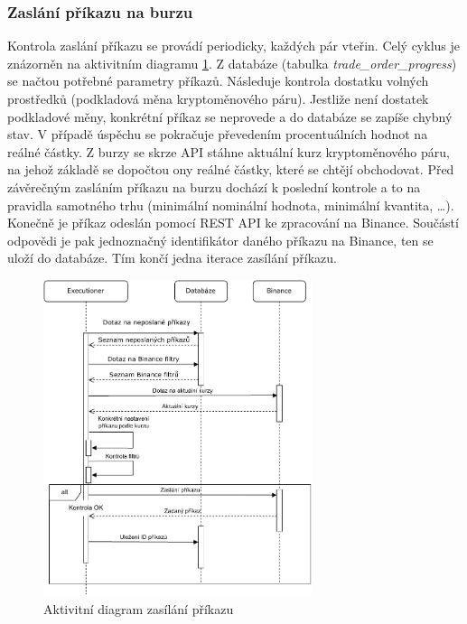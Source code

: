 \subsubsection{Zaslání příkazu na burzu}
Kontrola zaslání příkazu se provádí periodicky, každých pár vteřin. Celý cyklus je znázorněn na aktivitním diagramu \ref{figure:sending-trade-order}.
Z databáze (tabulka \emph{trade\_order\_progress}) se načtou potřebné parametry příkazů. Následuje kontrola
dostatku volných prostředků (podkladová měna kryptoměnového páru). Jestliže není dostatek podkladové měny, konkrétní příkaz se neprovede a do databáze se zapíše chybný stav. V případě
úspěchu se pokračuje převedením procentuálních hodnot na reálné částky. Z burzy se skrze API stáhne aktuální kurz kryptoměnového páru, na jehož základě se dopočtou ony reálné částky, které
se chtějí obchodovat. Před závěrečným zasláním příkazu na burzu dochází k poslední kontrole a to na pravidla samotného trhu (minimální nominální hodnota, minimální kvantita, \ldots).
Konečně je příkaz odeslán pomocí REST API ke zpracování na Binance. Součástí odpovědi je pak jednoznačný identifikátor daného příkazu na Binance, ten se uloží do databáze. Tím končí jedna
iterace zasílání příkazu.

\begin{figure}
    \centering
    \includegraphics[width=0.7\textwidth]{Figures/Trading-bot-sequence.pdf}
    \caption{Aktivitní diagram zasílání příkazu}
    \label{figure:sending-trade-order}
\end{figure}

